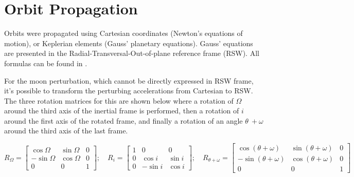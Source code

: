 \section{Orbit Propagation}
\label{sec:orbit_propagation}

Orbits were propagated using Cartesian coordinates (Newton’s equations of motion), or Keplerian elements (Gauss’ planetary equations). Gauss' equations are presented in the Radial-Transversal-Out-of-plane reference frame (RSW). All formulas can be found in \cite{curtis_book}.


For the moon perturbation, which cannot be directly expressed in RSW frame, it's possible to transform the perturbing accelerations from Cartesian to RSW. The three rotation matrices for this are shown below where a rotation of \(\Omega\) around the third axis of the inertial frame is performed, then a rotation of \(i\) around the first axis of the rotated frame, and finally a rotation of an angle \(\theta\ + \omega\) around the third axis of the last frame.

\begin{equation}
	R_{\Omega} = \begin{bmatrix}
		\cos \Omega & \sin \Omega & 0 \\
		-\sin \Omega & \cos \Omega & 0 \\
		0 & 0 & 1
	\end{bmatrix}; \quad
	R_{i} = \begin{bmatrix}
		1 & 0 & 0 \\
		0 & \cos i & \sin i \\
		0 & -\sin i & \cos i
	\end{bmatrix}; \quad
	R_{\theta + \omega} = \begin{bmatrix}
		\cos (\theta + \omega) & \sin (\theta + \omega) & 0 \\
		-\sin (\theta + \omega) & \cos (\theta + \omega) & 0 \\
		0 & 0 & 1
	\end{bmatrix}
\end{equation}



